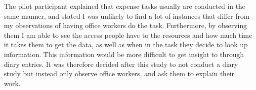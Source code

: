 The pilot participant explained that expense tasks usually are conducted in the same manner, and stated I was unlikely to find a lot of instances that differ from my observations of having office workers do the task.
Furthermore, by observing them I am able to see the access people have to the resources and how much time it takes them to get the data, as well as when in the task they decide to look up information. This information would be more difficult to get insight to through diary entries. It was therefore decided after this study to not conduct a diary study but instead only observe office workers, and ask them to explain their work.

